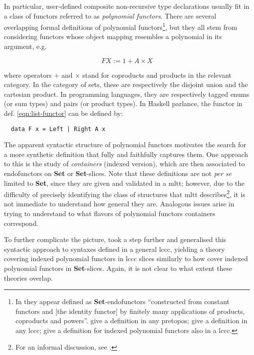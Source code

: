\documentclass[a4paper]{article}
\newcommand{\catname}[1]{{\normalfont\textbf{#1}}}
\newcommand{\Set}{\catname{Set}}
\begin{document}
In particular, user-defined composite non-recursive type declarations usually fit in a class of functors referred to as \textit{polynomial functors}. There are several overlapping formal definitions of polynomial functors\footnote{In \textcite{Goldblatt2001} they appear defined as \Set{}-endofunctors ``constructed from constant functors and [the identity functor] by finitely many applications of products, coproducts and powers''. \textcite{Moerdijk2000} give a definition in any pretopos; \textcite{Gambino2004} give a definition in any \gls{lccc}; \textcite{Gambino2009} give a definition for indexed polynomial functors also in a \gls{lccc}.}, but they all stem from considering functors whose object mapping resembles a polynomial in its argument, e.g.

\begin{equation}
	\label{eqn:list-functor}
	F X := 1 + A \times X
\end{equation}

\noindent where operators \(+\) and \(\times\) stand for coproducts and products in the relevant category. In the category of sets, these are respectively the disjoint union and the cartesian product. In programming languages, they are respectively tagged enums (or sum types) and pairs (or product types). In Haskell parlance, the functor in def. \ref{eqn:list-functor} can be defined by:

\begin{lstlisting}
  data F x = Left | Right A x 
\end{lstlisting}

The apparent syntactic structure of polynomial functors motivates the search for a more synthetic definition that fully and faithfully captures them. One approach to this is the study of \textit{containers} \cite{Abbott2003}\cite{Abbott2005}\cite{Altenkirch2015}(indexed version), which are then associated to endofunctors on \Set{} or \Set{}-slices. Note that these definitions are not \textit{per se} limited to \Set{}, since they are given and validated in a \gls{mltt}; however, due to the difficulty of precisely identifying the class of structures that \gls{mltt} describes\footnote{For an informal discussion, see \cite{Voevodsky2015}.}, it is not immediate to understand how general they are. Analogous issues arise in trying to understand to what flavors of polynomial functors containers correspond.

To further complicate the picture, \textcite{Gambino2009} took a step further and generalised this syntactic approach to syntaxes defined in a general \gls{lccc}, yielding a theory covering indexed polynomial functors in \gls{lccc} slices similarly to how \cite{Altenkirch2015} cover indexed polynomial functors in \Set{}-slices. Again, it is not clear to what extent these theories overlap.
\end{document}
